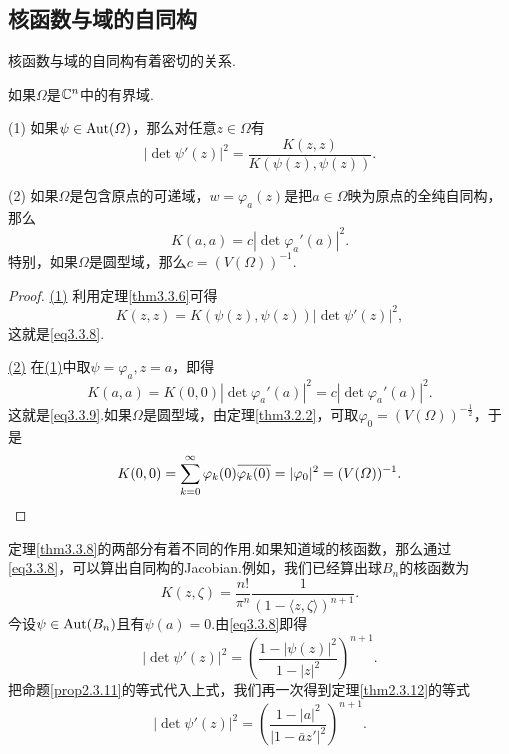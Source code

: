 \subsection{核函数与域的自同构}
核函数与域的自同构有着密切的关系.
\begin{theorem}\label{thm3.3.8}
	如果$\Omega$是$\MC^n$中的有界域.
	
	(1)\hypertarget{3.3.8}{}
	如果$\psi\in\Aut(\Omega)$，那么对任意$z\in\Omega$有
	\begin{equation}\label{eq3.3.8}
		\left|\det\psi'(z)\right|^2=\frac{K(z,z)}{K(\psi(z),\psi(z))}.
	\end{equation}
	
	(2)\hypertarget{3.3.8}{}
	如果$\Omega$是包含原点的可递域，$w=\varphi_a(z)$是把$a\in\Omega$映为原点的全纯自同构，那么
	\begin{equation}\label{eq3.3.9}
		K(a,a)=c\left|\det\varphi_a'(a)\right|^2.
	\end{equation}
	特别，如果$\Omega$是圆型域，那么$c=\left(V(\Omega)\right)^{-1}$.
\end{theorem}
\begin{proof}
	\hyperlink{3.3.8}{(1)}
	利用定理\ref{thm3.3.6}可得
	\[K(z,z)=K(\psi(z),\psi(z))|\det\psi'(z)|^2,\]
	这就是\eqref{eq3.3.8}.
	
	\hyperlink{3.3.8}{(2)}
	在\hyperlink{3.3.8}{(1)}中取$\psi=\varphi_a,z=a$，即得
	\[K(a,a)=K(0,0)|\det\varphi_a'(a)|^2=c|\det\varphi_a'(a)|^2.\]
	这就是\eqref{eq3.3.9}.如果$\Omega$是圆型域，由定理\ref{thm3.2.2}，可取$\varphi_0=(V(\Omega))^{-\frac12}$，于是
	\[K(0,0)=\sum_{k=0}^{\infty}\varphi_k(0)\bar{\varphi_k(0)}=|\varphi_0|^2=(V(\Omega))^{-1}.\qedhere\]
\end{proof}
定理\ref{thm3.3.8}的两部分有着不同的作用.如果知道域的核函数，那么通过\eqref{eq3.3.8}，可以算出自同构的Jacobian.例如，我们已经算出球$B_n$的核函数为
\[K(z,\zeta)=\frac{n!}{\pi^n}\frac1{(1-\langle z,\zeta\rangle)^{n+1}}.\]
今设$\psi\in\Aut(B_n)$且有$\psi(a)=0$.由\eqref{eq3.3.8}即得
\[|\det\psi'(z)|^2=\left(\frac{1-|\psi(z)|^2}{1-|z|^2}\right)^{n+1}.\]
把命题\ref{prop2.3.11}的等式代入上式，我们再一次得到定理\ref{thm2.3.12}的等式
\[|\det\psi'(z)|^2=\left(\frac{1-|a|^2}{|1-\bar{a}z'|^2}\right)^{n+1}.\]

